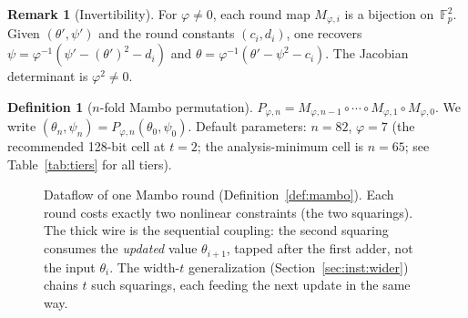\documentclass[11pt,a4paper]{article}
\theoremstyle{definition}
\newtheorem{definition}[theorem]{Definition}
\newtheorem{remark}[theorem]{Remark}
\newcommand{\Fp}{\mathbb{F}_p}
\begin{document}
\begin{remark}[Invertibility]\label{rem:invert}
For $\varphi \ne 0$, each round map $M_{\varphi,i}$ is a bijection
on~$\Fp^2$. Given $(\theta', \psi')$ and the round constants $(c_i, d_i)$,
one recovers
$\psi = \varphi^{-1}(\psi' - (\theta')^2 - d_i)$ and
$\theta = \varphi^{-1}(\theta' - \psi^2 - c_i)$. The Jacobian determinant
is $\varphi^2 \ne 0$.
\end{remark}

\begin{definition}[$n$-fold Mambo permutation]\label{def:mambo_n}
$P_{\varphi,n} = M_{\varphi,n-1} \circ \cdots \circ M_{\varphi,1} \circ
M_{\varphi,0}$. We write
$(\theta_n, \psi_n) = P_{\varphi,n}(\theta_0, \psi_0)$.
Default parameters: $n = 82$, $\varphi = 7$ (the recommended 128-bit
cell at $t = 2$; the analysis-minimum cell is $n = 65$; see
Table~\ref{tab:tiers} for all tiers).
\end{definition}

\begin{figure}[t]
\centering
{}
\caption{Dataflow of one Mambo round
(Definition~\ref{def:mambo}). Each round costs exactly two nonlinear
constraints (the two squarings). The thick wire is the sequential
coupling: the second squaring consumes the \emph{updated} value
$\theta_{i+1}$, tapped after the first adder, not the input
$\theta_i$. The width-$t$ generalization
(Section~\ref{sec:inst:wider}) chains $t$ such squarings, each
feeding the next update in the same way.}
\label{fig:round}
\end{figure}
\end{document}
